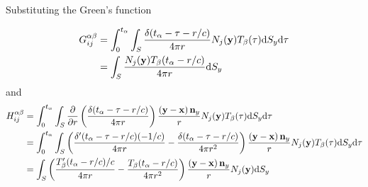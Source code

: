 \documentclass[a4paper,11pt,twoside]{paper}
\newcommand{\td}{\mathrm{d}}
\begin{document}
Substituting the Green's function

\begin{align}
G_{ij}^{\alpha \beta}
&=
\int_{0}^{t_{\alpha}} \int_{S}
\frac{\delta(t_{\alpha}-\tau-r/c)}{4\pi r}
N_j({\bf y}) T_{\beta}(\tau)
\td S_{y} \td \tau
\nonumber \\
&=
\int_{S}
\frac{N_j({\bf y}) T_{\beta}(t_{\alpha}-r/c)}{4\pi r}
\td S_{y}
\end{align}
%
and
%
\begin{align}
H_{ij}^{\alpha \beta}
&=
\int_{0}^{t_{\alpha}} \int_{S}
\frac{\partial}{\partial r}\left(\frac{\delta(t_{\alpha}-\tau-r/c)}{4\pi r}\right)
\frac{\left({\bf y}-{\bf x}\right){\bf n}_y}{r}
N_j({\bf y}) T_{\beta}(\tau)
\td S_{y} \td \tau
\nonumber \\
&=
\int_{0}^{t_{\alpha}} \int_{S}
\left(
\frac{\delta'(t_{\alpha}-\tau-r/c)(-1/c)}{4\pi r}
-
\frac{\delta(t_{\alpha}-\tau-r/c)}{4\pi r^2}
\right)
\frac{\left({\bf y}-{\bf x}\right){\bf n}_y}{r}
N_j({\bf y}) T_{\beta}(\tau)
\td S_{y} \td \tau
\nonumber \\
&=
\int_{S}
\left(
\frac{T'_{\beta}(t_{\alpha}-r/c)/c}{4\pi r}
-
\frac{T_{\beta}(t_{\alpha}-r/c)}{4\pi r^2}
\right)
\frac{\left({\bf y}-{\bf x}\right){\bf n}_y}{r}
N_j({\bf y})
\td S_{y}
\end{align}
%
\end{document}
